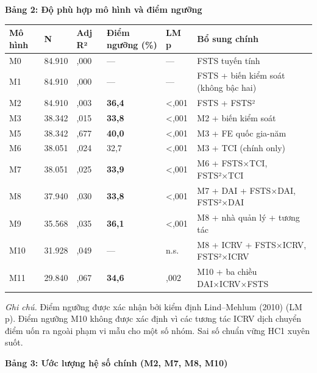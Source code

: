 \documentclass[12pt,a4paper]{article}
\begin{document}
\textbf{Bảng 2: Độ phù hợp mô hình và điểm ngưỡng}

\begin{longtable}[]{@{}llllll@{}}
\toprule\noalign{}
Mô hình & N & Adj R² & Điểm ngưỡng (\%) & LM p & Bổ sung chính \\
\midrule\noalign{}
\endhead
\bottomrule\noalign{}
\endlastfoot
M0 & 84.910 & ,000 & --- & --- & FSTS tuyến tính \\
M1 & 84.910 & ,000 & --- & --- & FSTS + biến kiểm soát (không bậc
hai) \\
M2 & 84.910 & ,003 & \textbf{36,4} & \textless,001 & FSTS + FSTS² \\
M3 & 38.342 & ,015 & \textbf{33,8} & \textless,001 & M2 + biến kiểm
soát \\
M5 & 38.342 & ,677 & \textbf{40,0} & \textless,001 & M3 + FE quốc
gia-năm \\
M6 & 38.051 & ,024 & 32,7 & \textless,001 & M3 + TCI (chính only) \\
M7 & 38.051 & ,025 & \textbf{33,9} & \textless,001 & M6 + FSTS×TCI,
FSTS²×TCI \\
M8 & 37.940 & ,030 & \textbf{33,8} & \textless,001 & M7 + DAI +
FSTS×DAI, FSTS²×DAI \\
M9 & 35.568 & ,035 & \textbf{36,1} & \textless,001 & M8 + nhà quản lý +
tương tác \\
M10 & 31.928 & ,049 & --- & n.s. & M8 + ICRV + FSTS×ICRV, FSTS²×ICRV \\
M11 & 29.840 & ,067 & \textbf{34,6} & ,002 & M10 + ba chiều
DAI×ICRV×FSTS \\
\end{longtable}

\emph{Ghi chú.} Điểm ngưỡng được xác nhận bởi kiểm định Lind--Mehlum
(2010) (LM p). Điểm ngưỡng M10 không được xác định vì các tương tác ICRV
dịch chuyển điểm uốn ra ngoài phạm vi mẫu cho một số nhóm. Sai số chuẩn
vững HC1 xuyên suốt.

\textbf{Bảng 3: Ước lượng hệ số chính (M2, M7, M8, M10)}
\end{document}
